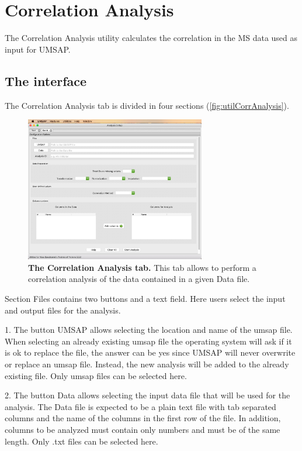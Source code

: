 \chapter{Correlation Analysis}
\label{chap:corrA}

The Correlation Analysis utility calculates the correlation in the MS data used
as input for UMSAP.

\section{The interface}

The Correlation Analysis tab is divided in four sections (\autoref{fig:utilCorrAnalysis}).

\begin{figure}[h]
    \centering
    \includegraphics[width=0.7\textwidth]{./IMAGES/UTIL-CORR-WINDOW/util-corr.jpg}
    \caption[The Correlation Analysis tab]{\textbf{The Correlation Analysis tab.}
    This tab allows to perform a correlation analysis of the data contained in a
    given Data file.} 
    \label{fig:utilCorrAnalysis}
    \vspace{-5pt}
\end{figure}

Section Files contains two buttons and a text field. Here users select the input
and output files for the analysis.

\num{1}. The button UMSAP allows selecting the location
and name of the umsap file. When selecting an already existing umsap file the operating
system will ask if it is ok to replace the file, the answer can be yes since UMSAP
will never overwrite or replace an umsap file. Instead, the new analysis will be
added to the already existing file. Only umsap files can be selected here.

\num{2}. The button Data allows selecting the input
data file that will be used for the analysis. The Data file is expected to be a
plain text file with tab separated columns and the name of the columns in the first
row of the file. In addition, columns to be analyzed must contain only numbers and
must be of the same length. Only .txt files can be selected here.

